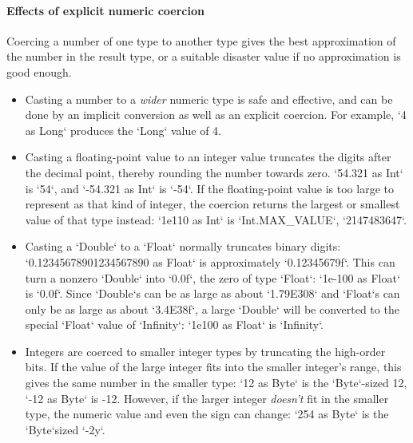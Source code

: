 


\paragraph{Effects of explicit numeric coercion}
\label{sec:effects-of-explicit-numeric-coercions}

Coercing a number of one type to another type gives the best approximation of
the number in the result type, or a suitable disaster value if no
approximation is good enough.  

\begin{itemize}
\item Casting a number to a {\em wider} numeric type is safe and effective,
      and can be done by an implicit conversion as well as an explicit
      coercion.  For example, \xcd`4 as Long` produces the \xcd`Long` value of
      4. 
\item Casting a floating-point value to an integer value truncates the digits
      after the decimal point, thereby rounding the number towards zero.  
      \xcd`54.321 as Int` is \xcd`54`, and 
      \xcd`-54.321 as Int` is \xcd`-54`.
      If the floating-point value is too large to represent as that kind of
      integer, the coercion returns the largest or smallest value of that type
      instead: \xcd`1e110 as Int` is 
      \xcd`Int.MAX_VALUE`, \viz{} \xcd`2147483647`. 

\item Casting a \xcd`Double` to a \xcd`Float` normally truncates binary digits: \\
      \xcd`0.12345678901234567890 as Float` is approximately \xcd`0.12345679f`.  This can
      turn a nonzero \xcd`Double` into \xcd`0.0f`, the zero of type
      \xcd`Float`: 
      \xcd`1e-100 as Float` is \xcd`0.0f`.  Since 
      \xcd`Double`s can be as large as about \xcd`1.79E308` and \xcd`Float`s
      can only be as large as about \xcd`3.4E38f`, a large \xcd`Double` will
      be converted to the special \xcd`Float` value of \xcd`Infinity`: 
      \xcd`1e100 as Float` is \xcd`Infinity`.
\item Integers are coerced to smaller integer types by truncating the
      high-order bits. If the value of the large integer fits into the smaller
      integer's range, this gives the same number in the smaller type: 
      \xcd`12 as Byte` is the \xcd`Byte`-sized 12, 
      \xcd`-12 as Byte` is -12. 
      However, if the larger integer {\em doesn't} fit in the smaller type,
      the numeric value and even the sign can change: \xcd`254 as Byte` is
      the \xcd`Byte`sized \xcd`-2y`.  


\end{itemize}
